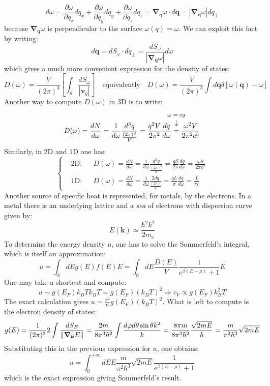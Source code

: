 \documentclass[10.75pt,a4paper,openright,bottom=2cm]{article}
\renewcommand{\Vec}[1]{\boldsymbol{#1}}
\begin{document}
\[
d\omega=\frac{\partial\omega}{\partial q_x}dq_x+\frac{\partial\omega}{\partial q_y}dq_y+\frac{\partial\omega}{\partial q_z}dq_z=\Vec{\nabla}_{\Vec{q}}\omega\cdot d\Vec{q}=|\Vec{\nabla}_{\Vec{q}}\omega|dq_\perp
\]
because $\Vec{\nabla}_{\Vec{q}}\omega$ is perpendicular to the surface $\omega(q)=\omega$. We can exploit this fact by writing: 
\[
d\Vec{q}=dS_\omega\cdot dq_\perp=\frac{dS_\omega}{|\Vec{\nabla}_{\Vec{q}}\omega|}d\omega
\]
which gives a much more convenient expression for the density of states:
\[
D(\omega)=\frac{V}{(2\pi)^3}\left[\int_S\frac{dS_\omega}{|\Vec{v}_g|}\right] \quad \text{equivalently} \quad D(\omega)=\frac{V}{(2\pi)^3}\int d\Vec{q}\delta[\omega(\Vec{q})-\omega]
\]
Another way to compute $D(\omega)$ in 3D is to write:
\[
D(\omega)=\frac{dN}{d\omega}=\frac{1}{d\omega}\frac{d^3q}{\frac{(2\pi)^3}{V}}=\frac{q^2V}{2\pi^2}\frac{dq}{d\omega}\overset{\mathclap{\tikz \node {$\downarrow$} node [above=1ex] {\footnotesize $\omega=cq$};}}{=}\frac{\omega^2V}{2\pi^2c^3}
\]
Similarly, in 2D and 1D one has:
\[
\left\{
\begin{aligned}
&\text{2D:} &&D(\omega)=\frac{dN}{d\omega}=\frac{1}{d\omega}\frac{d^2q}{\frac{(2\pi)^2}{S}}=\frac{qS}{2\pi}\frac{dq}{d\omega}=\frac{\omega S}{2\pi c^2}\\
&\text{1D:} &&D(\omega)=\frac{dN}{d\omega}=\frac{1}{d\omega}\frac{2dq}{\frac{(2\pi)}{L}}=\frac{qL}{\pi}\frac{dq}{d\omega}=\frac{L}{\pi c}
\end{aligned}
\right.
\]
Another source of specific heat is represented, for metals, by the electrons. In a metal there is an underlying lattice and a \textit{sea} of electrons with dispersion curve given by:
\[
E(\Vec{k})\simeq\frac{\hbar^2k^2}{2m_e}
\]
To determine the energy density $u$, one has to solve the Sommerfeld's integral, which is itself an approximation:
\[
u=\int_\mathbb{R}dEg(E)f(E)E=\int_\mathbb{R}dE\frac{D(E)}{V}\frac{1}{e^{\beta(E-\mu)}+1}E
\]
One may take a shortcut and compute:
\[
u\sim g(E_F)k_BTk_BT=g(E_F)(k_BT)^2\Rightarrow c_V\propto g(E_F)k_B^2T
\]
The exact calculation gives $u=\frac{\pi^2}{6}g(E_F)(k_BT)^2$. What is left to compute is the electron density of states:
\begin{equation}
\label{density}
g(E)=\frac{1}{(2\pi)^3}2\int\frac{dS_E}{\norm{\Vec{\nabla}_{\Vec{k}}E}}=\frac{2 m}{8\pi^3\hbar^2}\int\frac{d\varphi d\theta\sin\theta k^2}{k}=\frac{8\pi m}{8\pi^3\hbar^2}\frac{\sqrt{2mE}}{\hbar}=\frac{m}{\pi^2\hbar^3}\sqrt{2mE}
\end{equation}
Substituting this in the previous expression for $u$, one obtains:
\[
u=\int_0^{+\infty}dEE\frac{m}{\pi^2\hbar^3}\sqrt{2mE}\frac{1}{e^{\beta(E-\mu)}+1}
\]
which is the exact expression giving Sommerfeld's result.
\newpage
\end{document}
